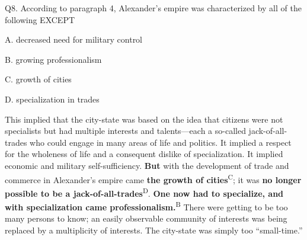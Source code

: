 \begin{blk}
    \begin{qst}
        Q8. According to paragraph 4, Alexander’s empire was characterized by all of the following EXCEPT
    \end{qst}

    \begin{chc}
        A. decreased need for military control

        B. growing professionalism

        C. growth of cities

        D. specialization in trades
    \end{chc}

    \begin{psgq}
        This implied that the city-state was based on the idea that citizens were not specialists but had multiple interests and talents—each a so-called jack-of-all-trades who could engage in many areas of life and politics. It implied a respect for the wholeness of life and a consequent dislike of specialization. It implied economic and military self-sufficiency. \textbf{But} with the development of trade and commerce in Alexander’s empire came \textbf{the growth of cities}\textsuperscript{C}; it was \textbf{no longer possible to be a jack-of-all-trades}\textsuperscript{D}. \textbf{One now had to specialize, and with specialization came professionalism.}\textsuperscript{B} There were getting to be too many persons to know; an easily observable community of interests was being replaced by a multiplicity of interests. The city-state was simply too “small-time.”
    \end{psgq}
\end{blk}
